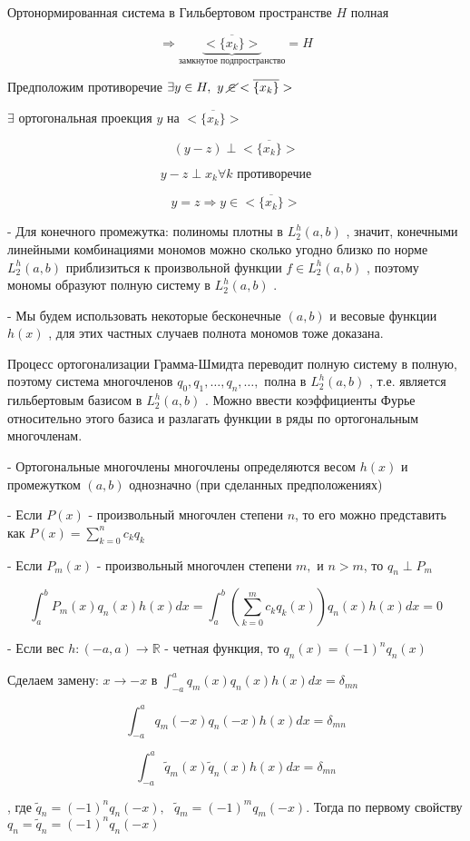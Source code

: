 \documentclass[12pt, a4paper]{report}
\begin{document}
Ортонормированная система в Гильбертовом пространстве \( H \) полная 

\[ \Rightarrow \underbrace{<\overline{\{x_k \}}  >}_{\text{замкнутое подпространство} } =H \] 

Предположим противоречие \( \exists  y \in  H , \text{ } y \text{ } \cancel{\in } <\overline{\{x_k \}}  > \) 

\( \exists   \) ортогональная  проекция  \( y  \) на \( <\overline{\{x_k \}}  > \) 

\[ (y -z )  \perp <\overline{\{x_k \}}  > \] 

\[ y- z \perp  x_k \forall  k \text{ противоречие}  \] 

\[ y = z \Rightarrow y \in <\overline{\{x_k \}}  > \] 

- Для конечного промежутка: полиномы плотны в \( L_2 ^h (a,b ) \) , значит, конечными линейными комбинациями мономов можно сколько угодно близко по норме \(  L_2 ^h (a,b ) \)  приблизиться к произвольной функции \( f \in  L_2 ^h (a,b ) \) , поэтому мономы образуют полную систему в \(  L_2 ^h (a,b ) \) . 

- Мы будем использовать некоторые бесконечные \( (a,b) \)  и весовые функции \( h(x) \) , для этих частных случаев полнота мономов тоже доказана. 

Процесс ортогонализации Грамма-Шмидта переводит полную систему в полную, поэтому система многочленов \(  q_0,q_1, \ldots, q_n, \ldots, \)  полна в \(  L_2 ^h (a,b ) \) , т.е. является гильбертовым базисом в \(  L_2 ^h (a,b ) \) . Можно ввести коэффициенты Фурье относительно этого базиса и разлагать функции в ряды по ортогональным многочленам.

- Ортогональные многочлены многочлены определяются весом \( h(x ) \) и промежутком \( (a,b) \) однозначно (при сделанных предположениях)

- Если \( P(x ) \) - произвольный многочлен степени \( n \), то его можно представить как \( P(x ) = \displaystyle  \sum_{k=0 }^ n c_k q_k \)  

- Если \( P_m(x ) \)  - произвольный многочлен степени \( m , \) и \( n>m \), то \( q_n \perp  P_m \) 

\[ \displaystyle  \int_{a }^{b } P_m(x ) q_n (x )h(x )dx = \int_{a }^{b      } \left( \sum_{k =0 }^m c_k q_k(x ) \right) q_n(x ) h(x ) dx = 0 \] 

- Если вес \( h: (-a , a ) \to  \mathbb{R} \) - четная функция, то \( q_n(x ) =(-1 )^n q_n (x ) \)

Сделаем замену: \( x \to  -x \text{ в }  \displaystyle  \int_{-a }^ a q_m (x )q_n(x )h(x )dx = \delta_{{mn}} \)

\[ \int_{-a }^{a } q_m (-x )q_n (-x )h(x )dx = \delta_{mn}  \]

\[ \int_{-a }^{a } \tilde{q }_m (x )\tilde{q }_n (x )h(x )dx = \delta_{mn} \] 

, где \( \tilde{q }_n =(-1 )^n q_n(-x ), \text{ } \tilde{ q}_m = (-1 )^m q_m(-x ) \). Тогда по первому свойству \( q_n = \tilde{q }_n = (-1 )^n q_n(-x ) \)  




\ifdefined\mainfile
\else
    
\end{document}
